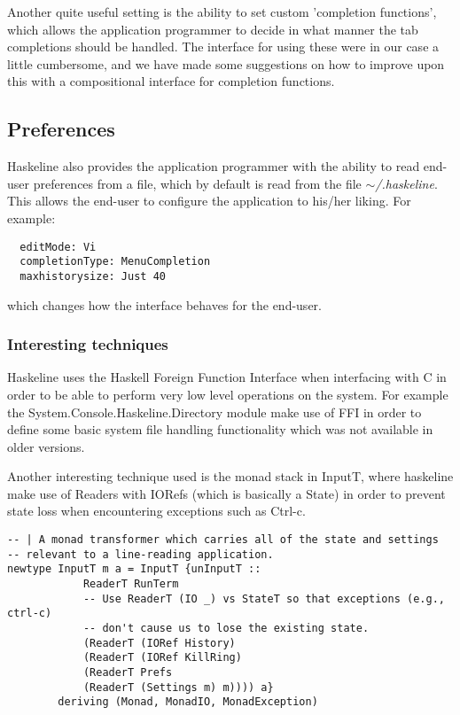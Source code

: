 \documentclass[11pt,a4paper]{article}
\begin{document}
Another quite useful setting is the ability to set custom 'completion
functions', which allows the application programmer to decide in what manner the
tab completions should be handled. The interface for using these were in our
case a little cumbersome, and we have made some suggestions on how to improve
upon this with a compositional interface for completion functions.

\subsection{Preferences}
Haskeline also provides the application programmer with the ability to read
end-user preferences from a file, which by default is read from the file
$\mathtt{\sim}$\textit{/.haskeline}. This allows the end-user to configure the
application to his/her liking. For example:

\begin{verbatim}
  editMode: Vi
  completionType: MenuCompletion
  maxhistorysize: Just 40
\end{verbatim}

which changes how the interface behaves for the end-user.

\subsubsection{Interesting techniques}
Haskeline uses the Haskell Foreign Function Interface when interfacing with C in
order to be able to perform very low level operations on the system. For example
the System.Console.Haskeline.Directory module make use of FFI in order to define
some basic system file handling functionality which was not available in older
versions.

Another interesting technique used is the monad stack in InputT, where
haskeline make use of Readers with IORefs (which is basically a State) in order
to prevent state loss when encountering exceptions such as Ctrl-c.

\begin{verbatim}
-- | A monad transformer which carries all of the state and settings
-- relevant to a line-reading application.
newtype InputT m a = InputT {unInputT ::
            ReaderT RunTerm
            -- Use ReaderT (IO _) vs StateT so that exceptions (e.g., ctrl-c)
            -- don't cause us to lose the existing state.
            (ReaderT (IORef History)
            (ReaderT (IORef KillRing)
            (ReaderT Prefs
            (ReaderT (Settings m) m)))) a}
        deriving (Monad, MonadIO, MonadException)
\end{verbatim}
\end{document}
